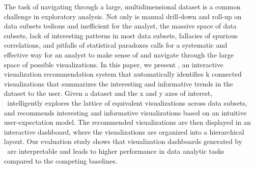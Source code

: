The task of navigating through a large, multidimensional dataset is a common challenge in exploratory analysis. Not only is manual drill-down and roll-up on data subsets tedious and inefficient for the analyst, the massive space of data subsets, lack of interesting patterns in most data subsets, fallacies of spurious correlations, and pitfalls of statistical paradoxes calls for a systematic and effective way for an analyst to make sense of and navigate through the large space of possible visualizations. In this paper, we present \system, an interactive visualization recommendation system that automatically identifies k connected visualizations that summarizes the interesting and informative trends in the dataset to the user. Given a dataset and the x and y axes of interest, \system\ intelligently explores the lattice of equivalent visualizations across data subsets, and recommends interesting and informative visualizations based on an intuitive user-expectation model. The recommended visualizations are then displayed in an interactive dashboard, where the visualizations are organized into a hierarchical layout. Our evaluation study shows that visualization dashboards generated by \system\ are interpretable and leads to higher performance in data analytic tasks compared to the competing baselines.
